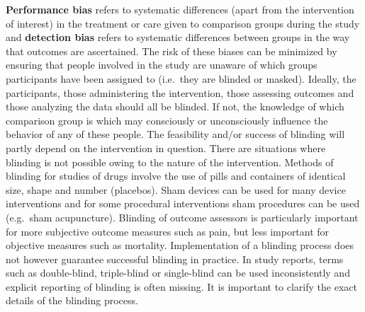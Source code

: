 \documentclass[
  11pt,
  a4paper,
  DIV=11,
  numbers=noendperiod]{scrreprt}
\begin{document}
\textbf{Performance bias} refers to systematic differences (apart from
the intervention of interest) in the treatment or care given to
comparison groups during the study and \textbf{detection bias} refers to
systematic differences between groups in the way that outcomes are
ascertained. The risk of these biases can be minimized by ensuring that
people involved in the study are unaware of which groups participants
have been assigned to (i.e.~they are blinded or masked). Ideally, the
participants, those administering the intervention, those assessing
outcomes and those analyzing the data should all be blinded. If not, the
knowledge of which comparison group is which may consciously or
unconsciously influence the behavior of any of these people. The
feasibility and/or success of blinding will partly depend on the
intervention in question. There are situations where blinding is not
possible owing to the nature of the intervention. Methods of blinding
for studies of drugs involve the use of pills and containers of
identical size, shape and number (placebos). Sham devices can be used
for many device interventions and for some procedural interventions sham
procedures can be used (e.g.~sham acupuncture). Blinding of outcome
assessors is particularly important for more subjective outcome measures
such as pain, but less important for objective measures such as
mortality. Implementation of a blinding process does not however
guarantee successful blinding in practice. In study reports, terms such
as double-blind, triple-blind or single-blind can be used inconsistently
and explicit reporting of blinding is often missing. It is important to
clarify the exact details of the blinding process.
\end{document}
